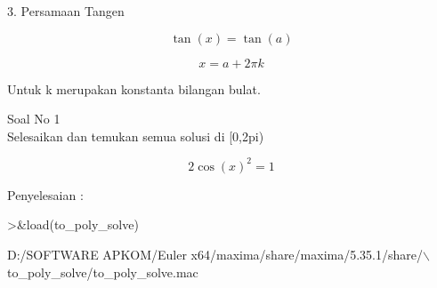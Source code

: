 \begin{eulernotebook}
\begin{eulercomment}
\begin{eulercomment}
\begin{eulercomment}
3. Persamaan Tangen\\
\end{eulercomment}
\begin{eulerformula}
\[
\tan(x) = \tan(a)
\]
\end{eulerformula}
\begin{eulerformula}
\[
x = a + 2\pi k
\]
\end{eulerformula}
\begin{eulercomment}
Untuk k merupakan konstanta bilangan bulat.

\end{eulercomment}
\begin{eulercomment}
Soal No 1\\
Selesaikan dan temukan semua solusi di [0,2pi)

\end{eulercomment}
\begin{eulerformula}
\[
2\cos(x)^2 =1
\]
\end{eulerformula}
\begin{eulercomment}
Penyelesaian :
\end{eulercomment}
\begin{eulerprompt}
>&load(to_poly_solve)
\end{eulerprompt}
\begin{euleroutput}
  
          D:/SOFTWARE APKOM/Euler x64/maxima/share/maxima/5.35.1/share/\(\backslash\)
  to_poly_solve/to_poly_solve.mac
  

\end{euleroutput}
\end{eulercomment}
\end{eulercomment}
\end{eulernotebook}
